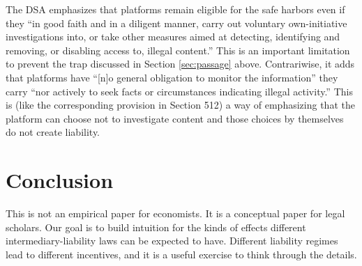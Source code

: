 The DSA emphasizes that platforms remain eligible for the safe harbors even if they ``in good faith and in a diligent manner, carry out voluntary own-initiative investigations into, or take other measures aimed at detecting, identifying and removing, or disabling access to, illegal content.'' This is an important limitation to prevent the  trap discussed in Section \ref{sec:passage} above. Contrariwise, it adds that platforms have ``[n]o general obligation to monitor the information'' they carry ``nor actively to seek facts or circumstances indicating illegal activity.'' This is (like the corresponding provision in Section 512) a way of emphasizing that the platform can choose not to investigate content and those choices by themselves do not create liability.

\section{Conclusion}

This is not an empirical paper for economists. It is a conceptual paper for legal scholars. Our goal is to build intuition for the kinds of effects different intermediary-liability laws can be expected to have. Different liability regimes lead to different incentives, and it is a useful exercise to think through the details.
